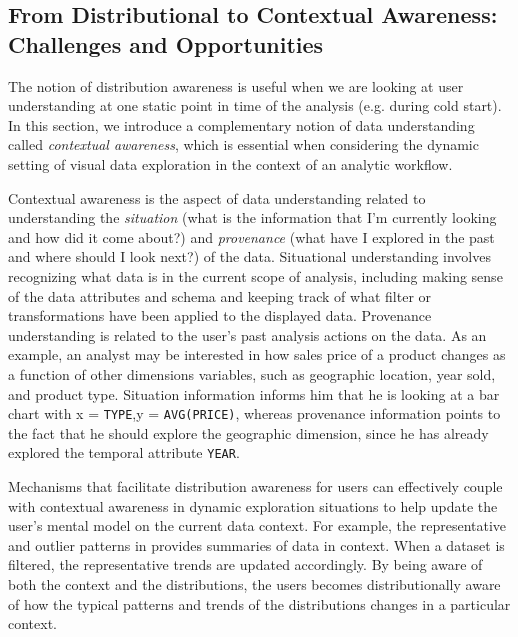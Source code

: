 \subsection{From Distributional to Contextual Awareness: Challenges and Opportunities}
\par The notion of distribution awareness is useful when we are looking at user understanding at one static point in time of the analysis (e.g. during cold start). In this section, we introduce a complementary notion of data understanding called \textit{contextual awareness}, which is essential when considering the dynamic setting of visual data exploration in the context of an analytic workflow.
\par Contextual awareness is the aspect of data understanding related to understanding the \textit{situation} (what is the information that I'm currently looking and how did it come about?) and \textit{provenance} (what have I explored in the past and where should I look next?) of the data. Situational understanding involves recognizing what data is in the current scope of analysis, including making sense of the data attributes and schema and keeping track of what filter or transformations have been applied to the displayed data. Provenance understanding is related to the user's past analysis actions on the data. As an example, an analyst may be interested in how sales price of a product changes as a function of other dimensions variables, such as geographic location, year sold, and product type. Situation information informs him that he is looking at a bar chart with x = \texttt{TYPE},y = \texttt{AVG(PRICE)}, whereas provenance information points to the fact that he should explore the geographic dimension, since he has already explored the temporal attribute \texttt{YEAR}.
\par Mechanisms that facilitate distribution awareness for users can effectively couple with contextual awareness in dynamic exploration situations to help update the user's mental model on the current data context. For example, the representative and outlier patterns in \zv provides summaries of data in context. When a dataset is filtered, the representative trends are updated accordingly. By being aware of both the context and the distributions, the users becomes distributionally aware of how the typical patterns and trends of the distributions changes in a particular context. %
